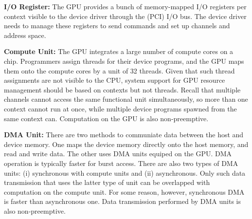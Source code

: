 \textbf{I/O Register:}
The GPU provides a bunch of memory-mapped I/O registers per context
visible to the device driver through the (PCI) I/O bus.
The device driver needs to manage these registers to send commands and
set up channels and address space.

\textbf{Compute Unit:}
The GPU integrates a large number of compute cores on a chip.
Programmers assign threads for their device programs, and the GPU maps
them onto the compute cores by a unit of 32 threads.
Given that such thread assignments are not visible to the CPU, system
support for GPU resource management should be based on contexts but not
threads.
Recall that multiple channels cannot access the same functional unit
simultaneously, so more than one context cannot run at once, while
multiple device programs spawned from the same context can.
Computation on the GPU is also non-preemptive.

\textbf{DMA Unit:}
There are two methods to communiate data between the host and device
memory.
One maps the device memory directly onto the host memory, and read and
write data.
The other uses DMA units equiped on the GPU.
DMA operation is typically faster for burst access.
There are also two types of DMA units: (i) synchronous with compute
units and (ii) asynchronous.
Only such data transmission that uses the latter type of unit can be
overlapped with computation on the compute unit.
For some reason, however, synchronous DMA is faster than asynchronous
one.
Data transmission performed by DMA units is also non-preemptive.
